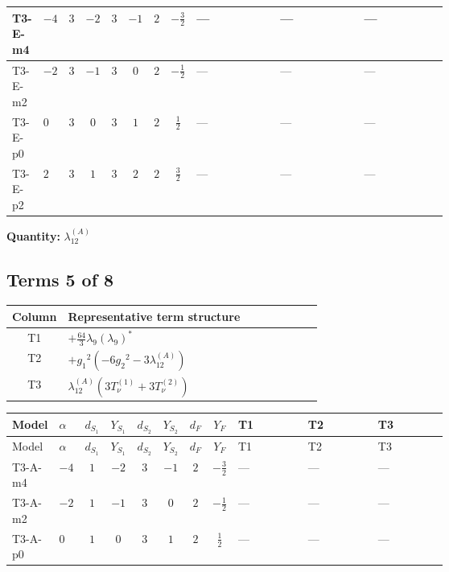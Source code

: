 \documentclass[8pt]{article}
\begin{document}
\begin{landscape}
\begin{longtable}{@{}llcccccc >{\raggedright\arraybackslash}p{0.21\linewidth} >{\raggedright\arraybackslash}p{0.21\linewidth} >{\raggedright\arraybackslash}p{0.21\linewidth}@{}}
\midrule
T3-E-m4 & $-4$ & $3$ & $-2$ & $3$ & $-1$ & $2$ & $-\frac{3}{2}$ & --- & --- & --- \\
\midrule
T3-E-m2 & $-2$ & $3$ & $-1$ & $3$ & $0$ & $2$ & $-\frac{1}{2}$ & --- & --- & --- \\
\midrule
T3-E-p0 & $0$ & $3$ & $0$ & $3$ & $1$ & $2$ & $\frac{1}{2}$ & --- & --- & --- \\
\midrule
T3-E-p2 & $2$ & $3$ & $1$ & $3$ & $2$ & $2$ & $\frac{3}{2}$ & --- & --- & --- \\
\midrule
\bottomrule
\end{longtable}
\clearpage
\noindent\textbf{Quantity: }$\lambda_{12}^{(A)}$\par\smallskip
\subsection*{Terms 5 of 8}
\begin{center}
\begin{tabular}{@{}c >{\raggedright\arraybackslash}p{0.82\linewidth}@{}}
\toprule
Column & Representative term structure \\
\midrule
T1 & \(\displaystyle +\frac{64}{3} {\lambda_{9}} \left({\lambda_{9}}\right)^{*}\) \\
\midrule
T2 & \(\displaystyle +{g_1}^2 \left(-6 {g_2}^2-3 {\lambda_{12}^{(A)}}\right)\) \\
\midrule
T3 & \(\displaystyle {\lambda_{12}^{(A)}} (3 T_{\nu}^{(1)}+3 T_{\nu}^{(2)})\) \\
\midrule
\bottomrule
\end{tabular}
\end{center}
\smallskip
\tiny
\begin{longtable}{@{}llcccccc >{\raggedright\arraybackslash}p{0.21\linewidth} >{\raggedright\arraybackslash}p{0.21\linewidth} >{\raggedright\arraybackslash}p{0.21\linewidth}@{}}
\toprule
Model & $\alpha$ & $d_{S_1}$ & $Y_{S_1}$ & $d_{S_2}$ & $Y_{S_2}$ & $d_F$ & $Y_F$ & T1 & T2 & T3 \\
\midrule
\endfirsthead
\toprule
Model & $\alpha$ & $d_{S_1}$ & $Y_{S_1}$ & $d_{S_2}$ & $Y_{S_2}$ & $d_F$ & $Y_F$ & T1 & T2 & T3 \\
\midrule
\endhead
T3-A-m4 & $-4$ & $1$ & $-2$ & $3$ & $-1$ & $2$ & $-\frac{3}{2}$ & --- & --- & --- \\
\midrule
T3-A-m2 & $-2$ & $1$ & $-1$ & $3$ & $0$ & $2$ & $-\frac{1}{2}$ & --- & --- & --- \\
\midrule
T3-A-p0 & $0$ & $1$ & $0$ & $3$ & $1$ & $2$ & $\frac{1}{2}$ & --- & --- & --- \\

\end{longtable}
\end{landscape}
\end{document}
